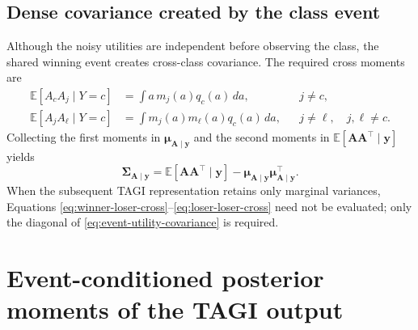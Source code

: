 \documentclass[11pt]{article}
\newcommand{\E}{\mathbb{E}}
\newcommand{\trans}{\intercal}
\begin{document}
\subsection{Dense covariance created by the class event}

Although the noisy utilities are independent before observing the class, the
shared winning event creates cross-class covariance.  The required cross
moments are
\begin{align}
 \E[A_cA_j\mid Y=c]
 &=
 \int a\,m_j(a)q_c(a)\,da,
 &&j\ne c,
 \label{eq:winner-loser-cross}
 \\
 \E[A_jA_\ell\mid Y=c]
 &=
 \int m_j(a)m_\ell(a)q_c(a)\,da,
 &&j\ne\ell,\quad j,\ell\ne c.
 \label{eq:loser-loser-cross}
\end{align}
Collecting the first moments in $\bm\mu_{\bm A\mid\bm y}$ and the second
moments in $\E[\bm A\bm A^\trans\mid\bm y]$ yields
\begin{equation}
 \bm\Sigma_{\bm A\mid\bm y}
 =
 \E[\bm A\bm A^\trans\mid\bm y]
 -
 \bm\mu_{\bm A\mid\bm y}
 \bm\mu_{\bm A\mid\bm y}^\trans.
 \label{eq:event-utility-covariance}
\end{equation}
When the subsequent TAGI representation retains only marginal variances,
Equations \eqref{eq:winner-loser-cross}--\eqref{eq:loser-loser-cross} need not
be evaluated; only the diagonal of \eqref{eq:event-utility-covariance} is
required.

\section{Event-conditioned posterior moments of the TAGI output}
\end{document}
